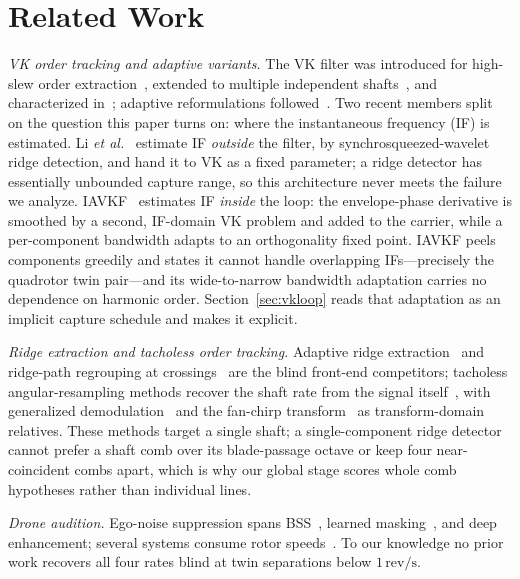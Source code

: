 \documentclass[journal]{IEEEtran}
\newcommand{\revps}{\ensuremath{\,\mathrm{rev/s}}}
\begin{document}
\section{Related Work}
\label{sec:related}

\emph{VK order tracking and adaptive variants.} The VK filter was
introduced for high-slew order extraction~\cite{vold1993high}, extended to
multiple independent shafts~\cite{vold1997multi}, and characterized
in~\cite{herlufsen1999characteristics,tuma2000characteristics}; adaptive
reformulations followed~\cite{pan2007adaptive,pan2010extended}. Two recent
members split on the question this paper turns on: where the instantaneous
frequency (IF) is estimated. Li \emph{et al.}~\cite{li2020vkswt} estimate
IF \emph{outside} the filter, by synchrosqueezed-wavelet ridge detection,
and hand it to VK as a fixed parameter; a ridge detector has essentially
unbounded capture range, so this architecture never meets the failure we
analyze. IAVKF~\cite{jiang2024iavkf} estimates IF \emph{inside} the loop:
the envelope-phase derivative is smoothed by a second, IF-domain VK
problem and added to the carrier, while a per-component bandwidth adapts
to an orthogonality fixed point. IAVKF peels components greedily and
states it cannot handle overlapping IFs---precisely the quadrotor twin
pair---and its wide-to-narrow bandwidth adaptation carries no dependence
on harmonic order. Section~\ref{sec:vkloop} reads that adaptation as an
implicit capture schedule and makes it explicit.

\emph{Ridge extraction and tacholess order tracking.} Adaptive ridge
extraction~\cite{iatsenko2016ridges,aare2023ridge} and ridge-path
regrouping at crossings~\cite{chen2017rprg} are the blind front-end
competitors; tacholess angular-resampling methods recover the shaft rate
from the signal itself~\cite{peeters2019tacholess,wang2019tlot}, with
generalized demodulation~\cite{olhede2005generalized} and the fan-chirp
transform~\cite{weruaga2007fanchirp} as transform-domain relatives. These
methods target a single shaft; a single-component ridge detector cannot
prefer a shaft comb over its blade-passage octave or keep four
near-coincident combs apart, which is why our global stage scores whole
comb hypotheses rather than individual lines.

\emph{Drone audition.} Ego-noise suppression spans
BSS~\cite{wang2020bss}, learned masking~\cite{wang2020dnntf}, and deep
enhancement; several systems consume rotor
speeds~\cite{yen2023ncm,gulli2025rotorcond}. To our knowledge no prior
work recovers all four rates blind at twin separations below $1\revps$.
\end{document}
